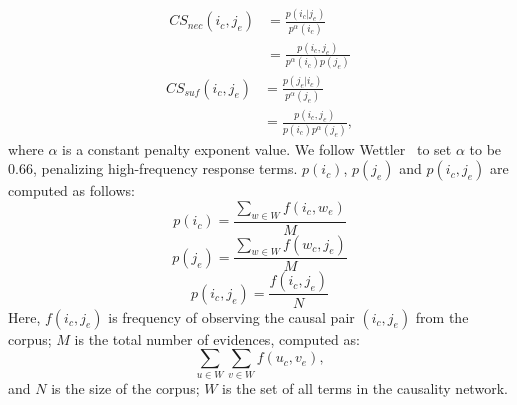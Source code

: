 \documentclass[letterpaper]{article}
\begin{document}
\begin{align}
CS_{nec}(i_c,j_e)  & =  \frac{p(i_c|j_e)}{p^{\alpha}(i_c)} \nonumber \\
                   & = \frac{p(i_c,j_e)}{p^{\alpha}(i_c)p(j_e)}
\label{eq:csnec}
\end{align}
\begin{align}
	CS_{suf}(i_c,j_e) & = \frac{p(j_e|i_c)}{p^{\alpha}{(j_e)}} \nonumber \\
                  & = \frac{p(i_c,j_e)}{p(i_c)p^{\alpha}(j_e)}
,\label{eq:cssuf}
\end{align}
where $\alpha$ is a constant penalty exponent value.
We follow Wettler~ to set $\alpha$ to be $0.66$,
penalizing high-frequency response terms.
$p(i_c)$, $p(j_e)$ and $p(i_c,j_e)$ are computed as follows:
\begin{equation}
p(i_c) = \frac{\sum_{w\in W}
f (i_c,w_e)}{M}
\end{equation}
\begin{equation}
p(j_e) = \frac{\sum_{w\in W}
f (w_c,j_e)}{M}
\end{equation}
\begin{equation}
p(i_c,j_e) = \frac{f(i_c,j_e)}{N}
\end{equation}
Here, $f(i_c,j_e)$ is frequency of observing the causal pair
$(i_c,j_e)$
from the corpus; $M$ is the total number of evidences, computed as:
$$\sum_{u\in W} \sum_{v\in W} f(u_c,v_e),$$
and $N$ is the size of the corpus;
$W$ is the set of all terms in the causality network.
\end{document}

